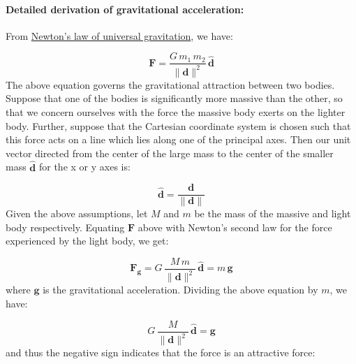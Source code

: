 \documentclass[12pt]{article}
\begin{document}
\paragraph{Detailed derivation of gravitational acceleration:}
\label{GD:accelGravityDeriv}
From \hyperref[TM:UniversalGravLaw]{Newton's law of universal gravitation}, we have:

\begin{displaymath}
\symbf{F}=\frac{G\,{m_{1}}\,{m_{2}}}{{\|\symbf{d}\|^{2}}}\,\symbf{\hat{d}}
\end{displaymath}
The above equation governs the gravitational attraction between two bodies. Suppose that one of the bodies is significantly more massive than the other, so that we concern ourselves with the force the massive body exerts on the lighter body. Further, suppose that the Cartesian coordinate system is chosen such that this force acts on a line which lies along one of the principal axes. Then our unit vector directed from the center of the large mass to the center of the smaller mass $\symbf{\hat{d}}$ for the x or y axes is:

\begin{displaymath}
\symbf{\hat{d}}=\frac{\symbf{d}}{\|\symbf{d}\|}
\end{displaymath}
Given the above assumptions, let $M$ and $m$ be the mass of the massive and light body respectively. Equating $\symbf{F}$ above with Newton's second law for the force experienced by the light body, we get:

\begin{displaymath}
{\symbf{F}_{\symbf{g}}}=G\,\frac{M\,m}{{\|\symbf{d}\|^{2}}}\,\symbf{\hat{d}}=m\,\symbf{g}
\end{displaymath}
where $\symbf{g}$ is the gravitational acceleration. Dividing the above equation by $m$,  we have:

\begin{displaymath}
G\,\frac{M}{{\|\symbf{d}\|^{2}}}\,\symbf{\hat{d}}=\symbf{g}
\end{displaymath}
and thus the negative sign indicates that the force is an attractive force:
\end{document}
